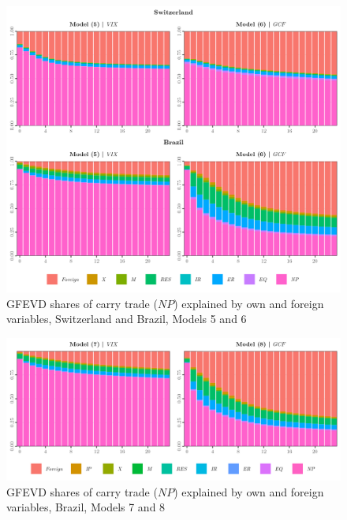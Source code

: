 \documentclass[a4paper, twoside]{templates/ociamthesis}
\newcommand*{\bibtitle}{References}
\begin{document}
\begin{figure}[!ht]

{\centering \includegraphics[width=0.75\columnwidth]{figure/g.GFEVD.MODEL56.CHBR} 

}

\caption{GFEVD shares of carry trade ($NP$) explained by own and foreign variables, Switzerland and Brazil, Models 5 and 6}\label{fig:FigureGFEVD56CHBR}
\end{figure}

\clearpage

\begin{figure}[!ht]

{\centering \includegraphics[width=0.75\columnwidth]{figure/g.GFEVD.MODEL78.BR} 

}

\caption{GFEVD shares of carry trade ($NP$) explained by own and foreign variables, Brazil, Models 7 and 8}\label{fig:FigureGFEVD78BR}
\end{figure}

\clearpage


\setlength{\baselineskip}{0pt} %

{\renewcommand*\MakeUppercase[1]{#1}%
\printbibliography[heading=bibintoc,title={\bibtitle}]}
\end{document}
